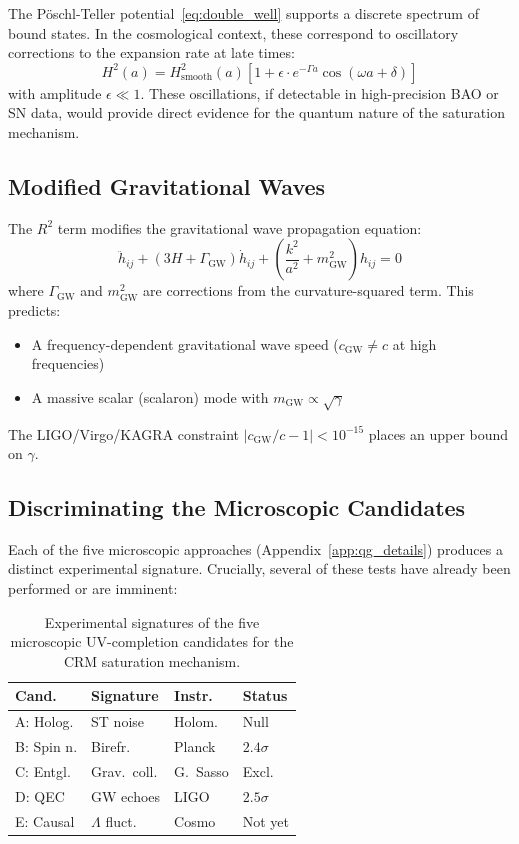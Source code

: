 \documentclass[aps,prd,twocolumn,superscriptaddress,nofootinbib]{revtex4-2}
\begin{document}
The P\"oschl-Teller potential~\eqref{eq:double_well} supports a discrete spectrum of bound states. In the cosmological context, these correspond to oscillatory corrections to the expansion rate at late times:
\begin{equation}
H^2(a) = H^2_{\mathrm{smooth}}(a) \left[1 + \epsilon \cdot e^{-\Gamma a} \cos(\omega a + \delta)\right]
\end{equation}
with amplitude $\epsilon \ll 1$. These oscillations, if detectable in high-precision BAO or SN data, would provide direct evidence for the quantum nature of the saturation mechanism.

\subsection{Modified Gravitational Waves}

The $R^2$ term modifies the gravitational wave propagation equation:
\begin{equation}
\ddot{h}_{ij} + (3H + \Gamma_{\mathrm{GW}})\dot{h}_{ij} + \left(\frac{k^2}{a^2} + m_{\mathrm{GW}}^2\right) h_{ij} = 0
\end{equation}
where $\Gamma_{\mathrm{GW}}$ and $m_{\mathrm{GW}}^2$ are corrections from the curvature-squared term. This predicts:
\begin{itemize}
\item A frequency-dependent gravitational wave speed ($c_{\mathrm{GW}} \neq c$ at high frequencies)
\item A massive scalar (scalaron) mode with $m_{\mathrm{GW}} \propto \sqrt{\gamma}$
\end{itemize}
The LIGO/Virgo/KAGRA constraint $|c_{\mathrm{GW}}/c - 1| < 10^{-15}$ \cite{Abbott2017} places an upper bound on $\gamma$.

\subsection{Discriminating the Microscopic Candidates}

Each of the five microscopic approaches (Appendix~\ref{app:qg_details}) produces a distinct experimental signature. Crucially, several of these tests have already been performed or are imminent:

\begin{table}[h]
\centering
\caption{Experimental signatures of the five microscopic UV-completion candidates for the CRM saturation mechanism.}
\label{tab:uv_tests}
\footnotesize
\begin{tabular}{llll}
\toprule
\textbf{Cand.} & \textbf{Signature} & \textbf{Instr.} & \textbf{Status} \\
\midrule
A: Holog. & ST noise & Holom. & Null \\
B: Spin n. & Birefr. & Planck & $2.4\sigma$ \\
C: Entgl. & Grav.\ coll. & G.\ Sasso & Excl. \\
D: QEC & GW echoes & LIGO & $2.5\sigma$ \\
E: Causal & $\Lambda$ fluct. & Cosmo & Not yet \\
\bottomrule
\end{tabular}
\end{table}
\end{document}
